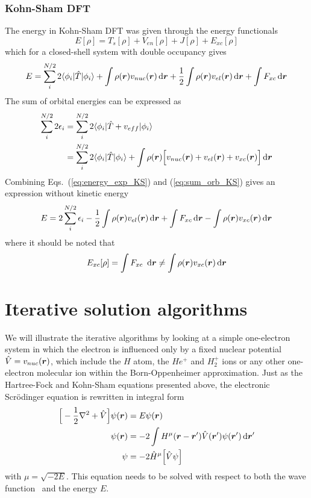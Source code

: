 \subsubsection{Kohn-Sham DFT}
The energy in Kohn-Sham DFT was given through the energy functionals
\begin{equation}
    E[\rho] = T_s[\rho] + V_{en}[\rho] + J[\rho] + E_{xc}[\rho]
\end{equation}
which for a closed-shell system with double occupancy gives
\begin{equation}
    \label{eq:energy_exp_KS}
    E = \sum_i^{N/2} 2\langle \phi_i|\hat{T}|\phi_i \rangle
	+ \int \rho(\boldsymbol r)v_{nuc}(\boldsymbol r) \,\mathrm{d}\boldsymbol r
	+ \frac{1}{2} \int \rho(\boldsymbol r)v_{el}(\boldsymbol r) \,\mathrm{d}\boldsymbol r
	+ \int F_{xc} \,\mathrm{d}\boldsymbol r
\end{equation}
The sum of orbital energies can be expressed as
\begin{align}
    \sum_i^{N/2} 2\epsilon_i 
	&= \sum_i^{N/2} 2\langle\phi_i|\hat{T} + v_{eff}|\phi_i\rangle\\
    \label{eq:sum_orb_KS}
	&= \sum_i^{N/2} 2\langle\phi_i|\hat{T}|\phi_i\rangle
	    + \int \rho(\boldsymbol r)\Big[v_{nuc}(\boldsymbol r)+v_{el}(\boldsymbol r)+v_{xc}(\boldsymbol r)\Big] \,\mathrm{d}\boldsymbol r
\end{align}
Combining Eqs.~(\ref{eq:energy_exp_KS}) and (\ref{eq:sum_orb_KS}) gives an expression without
kinetic energy
\begin{equation}
    E = 2 \sum_i^{N/2} \epsilon_i - \frac{1}{2} \int \rho(\boldsymbol r)v_{el}(\boldsymbol r) \,\mathrm{d}\boldsymbol r
	+ \int F_{xc} \,\mathrm{d}\boldsymbol r - \int \rho(\boldsymbol r)v_{xc}(\boldsymbol r) \,\mathrm{d}\boldsymbol r
\end{equation}
where it should be noted that
\begin{equation}
    E_{xc}[\rho] = \int F_{xc} \ud\bs{r} \neq \int \rho(\bs{r})v_{xc}(\bs{r}) \ud\bs{r}
\end{equation}

\section{Iterative solution algorithms}\label{sec:algorithms}
We will illustrate the iterative algorithms by looking at a simple one-electron system in which the 
electron is influenced only by a fixed nuclear potential $\hat{V} = v_{nuc}(\boldsymbol r)$, which include 
the $H$ atom, the $He^+$ and $H_2^+$ ions or any other one-electron molecular ion within the 
Born-Oppenheimer approximation. Just as the Hartree-Fock and Kohn-Sham equations presented above, 
the electronic Scr\"{o}dinger equation is rewritten in integral form
\begin{align}
    \Big[-\frac{1}{2}\nabla^2 + \hat{V}\Big]\psi(\boldsymbol r) &= E\psi(\boldsymbol r)\\
    \psi(\boldsymbol r)&=-2\int H^{\mu}(\boldsymbol r-\boldsymbol r')\hat{V}(\boldsymbol r')\psi(\boldsymbol r')\,\mathrm{d}\boldsymbol r'\\
    \label{eq:int_schr}
    \psi &= -2 \hat{H}^{\mu}\Big[\hat{V}\psi\Big]
\end{align}
with $\mu = \sqrt{-2E}$. This equation needs to be solved with respect to both the wave function
\wavefunction\ and the energy $E$.

